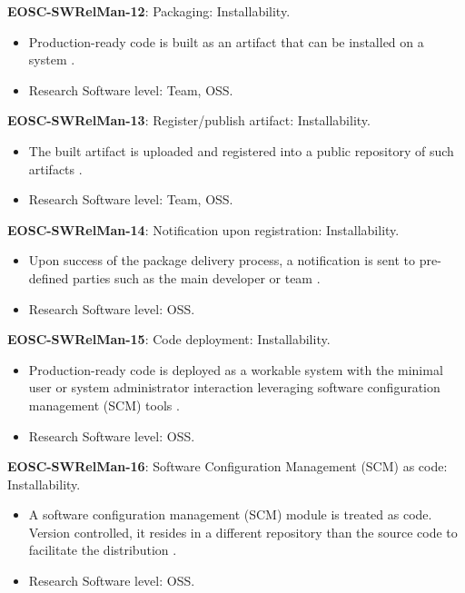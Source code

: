 \textbf{EOSC-SWRelMan-12}: Packaging: Installability.

\begin{itemize}
    \item Production-ready code is  built as an artifact that can be installed on a system \cite{shepherdson_cessda_2019,orviz_set_2017,raymond_software_2013}.
    \item Research Software level: Team, OSS.
\end{itemize}

\textbf{EOSC-SWRelMan-13}: Register/publish artifact: Installability.

\begin{itemize}
    \item The built artifact is uploaded and registered into a public repository of such artifacts \cite{orviz_set_2017}.
    \item Research Software level: Team, OSS.
\end{itemize}

\textbf{EOSC-SWRelMan-14}: Notification upon registration: Installability.

\begin{itemize}
    \item Upon success of the package delivery process, a notification is sent to pre-defined parties such as the main developer or team \cite{orviz_set_2017}.
    \item Research Software level: OSS.
\end{itemize}

\textbf{EOSC-SWRelMan-15}: Code deployment: Installability.

\begin{itemize}
    \item Production-ready code is deployed as a workable system with the minimal user or system administrator interaction leveraging software configuration management (SCM) tools \cite{orviz_set_2017}.
    \item Research Software level: OSS.
\end{itemize}

\textbf{EOSC-SWRelMan-16}: Software Configuration Management (SCM) as code: Installability.

\begin{itemize}
    \item A software configuration management (SCM) module is treated as code. Version controlled, it resides in a different repository than the source code to facilitate the distribution \cite{orviz_set_2017}.
    \item Research Software level: OSS.
\end{itemize}

